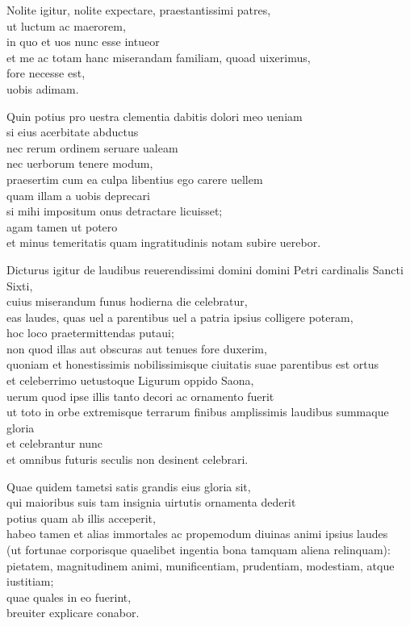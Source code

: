 \documentclass[a5paper,twoside]{article}
\begin{document}
Nolite igitur, nolite expectare, praestantissimi patres, \\
ut luctum ac maerorem, \\
in quo et uos nunc esse intueor \\
et me ac totam hanc miserandam familiam, quoad uixerimus, \\
fore necesse est, \\
uobis adimam. 

Quin potius pro uestra clementia dabitis dolori meo ueniam \\
si eius acerbitate abductus \\
nec rerum ordinem seruare ualeam \\
nec uerborum tenere modum, \\
praesertim cum ea culpa libentius ego carere uellem \\
quam illam a uobis deprecari \\
si mihi impositum onus detractare licuisset; \\
agam tamen ut potero \\
et minus temeritatis quam ingratitudinis notam subire uerebor.

Dicturus igitur de laudibus reuerendissimi domini domini Petri cardinalis Sancti Sixti, \\
cuius miserandum funus hodierna die celebratur, \\
eas laudes, quas uel a parentibus uel a patria ipsius colligere poteram, \\
hoc loco praetermittendas putaui; \\
non quod illas aut obscuras aut tenues fore duxerim, \\
quoniam et honestissimis nobilissimisque ciuitatis suae parentibus est ortus \\
et celeberrimo uetustoque Ligurum oppido Saona, \\
uerum quod ipse illis tanto decori ac ornamento fuerit \\
ut toto in orbe extremisque terrarum finibus amplissimis laudibus summaque gloria \\
et celebrantur nunc \\
et omnibus futuris seculis non desinent celebrari. 

Quae quidem tametsi satis grandis eius gloria sit, \\
qui maioribus suis tam insignia uirtutis ornamenta dederit \\
potius quam ab illis acceperit, \\
habeo tamen et alias immortales ac propemodum diuinas animi ipsius laudes \\
(ut fortunae corporisque quaelibet ingentia bona tamquam aliena relinquam): \\
pietatem, magnitudinem animi, munificentiam, prudentiam, modestiam, atque iustitiam; \\
quae quales in eo fuerint, \\
breuiter explicare conabor.
\end{document}
